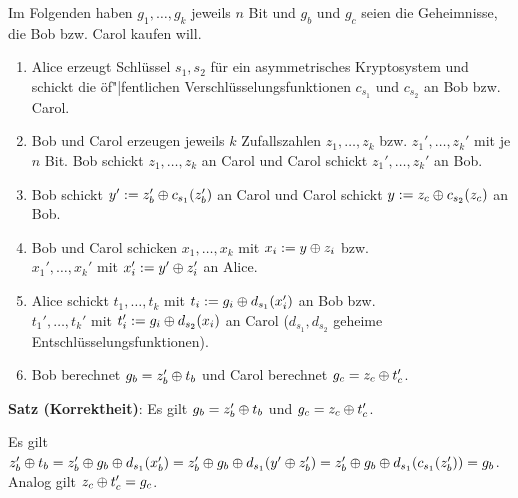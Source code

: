 Im Folgenden haben $g_1, \dotsc, g_k$ jeweils $n$ Bit
und $g_b$ und $g_c$ seien die Geheimnisse, die Bob bzw. Carol kaufen will.
\begin{enumerate}
    \item
    Alice erzeugt Schlüssel $s_1, s_2$ für ein asymmetrisches Kryptosystem und schickt
    die öf"|fentlichen Verschlüsselungsfunktionen $c_{s_1}$ und $c_{s_2}$ an Bob bzw. Carol.

    \item
    Bob und Carol erzeugen jeweils $k$ Zufallszahlen $z_1, \dotsc, z_k$ bzw.
    $z_1', \dotsc, z_k'$ mit je $n$ Bit.
    Bob schickt $z_1, \dotsc, z_k$ an Carol und
    Carol schickt $z_1', \dotsc, z_k'$ an Bob.

    \item
    Bob schickt $y' := z_b' \oplus c_{s_1}(z_b')$ an Carol und
    Carol schickt $y := z_c \oplus c_{s_2}(z_c)$ an Bob.

    \item
    Bob und Carol schicken $x_1, \dotsc, x_k$ mit $x_i := y \oplus z_i$ bzw.\\
    $x_1', \dotsc, x_k'$ mit $x_i' := y' \oplus z_i'$ an Alice.

    \item
    Alice schickt $t_1, \dotsc, t_k$ mit $t_i := g_i \oplus d_{s_1}(x_i')$ an Bob bzw.\\
    $t_1', \dotsc, t_k'$ mit $t_i' := g_i \oplus d_{s_2}(x_i)$ an Carol
    ($d_{s_1}, d_{s_2}$ geheime Entschlüsselungsfunktionen).

    \item
    Bob berechnet $g_b = z_b' \oplus t_b$ und
    Carol berechnet $g_c = z_c \oplus t_c'$.
\end{enumerate}

\linie

\textbf{Satz (Korrektheit)}:
Es gilt $g_b = z_b' \oplus t_b$ und $g_c = z_c \oplus t_c'$.

\begin{Beweis}
    Es gilt $z_b' \oplus t_b = z_b' \oplus g_b \oplus d_{s_1}(x_b')
    = z_b' \oplus g_b \oplus d_{s_1}(y' \oplus z_b') = z_b' \oplus g_b \oplus d_{s_1}(c_{s_1}(z_b')) = g_b$.
    Analog gilt $z_c \oplus t_c' = g_c$.
\end{Beweis}

\linie

